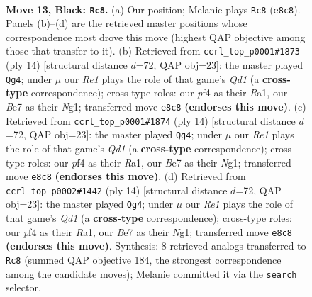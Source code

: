 \documentclass[11pt]{article}
\begin{document}
\clearpage

\begin{figure}[p]\centering
\begin{subfigure}{0.46\textwidth}\centering
\resizebox{\linewidth}{!}{%
\newchessgame
\chessboard[
  setfen={rn2r1k1/ppp1bp1p/3q2p1/3pNb2/P2P1P1P/6P1/1P2P3/RNBQ1RK1 b - - 0 13},
  showmover=false,
  pgfstyle=straightmove, color=movearrow, markmove={e8-c8}
]}
\caption{}
\end{subfigure}\hfill
\begin{subfigure}{0.46\textwidth}\centering
\resizebox{\linewidth}{!}{%
\newchessgame
\chessboard[
  setfen={rnbqk2r/ppp2pp1/4p2p/3pP3/3Pn3/2P5/P1PB1PPP/R2QKBNR w KQkq - 1 8},
  showmover=false,
  pgfstyle=straightmove, color=movearrow, markmove={d1-g4}
]}
\caption{}
\end{subfigure}
\\[4pt]
\begin{subfigure}{0.46\textwidth}\centering
\resizebox{\linewidth}{!}{%
\newchessgame
\chessboard[
  setfen={rnbqk2r/ppp2pp1/4p2p/3pP3/3Pn3/2P5/P1PB1PPP/R2QKBNR w KQkq - 1 8},
  showmover=false,
  pgfstyle=straightmove, color=movearrow, markmove={d1-g4}
]}
\caption{}
\end{subfigure}\hfill
\begin{subfigure}{0.46\textwidth}\centering
\resizebox{\linewidth}{!}{%
\newchessgame
\chessboard[
  setfen={rnbqk2r/ppp2pp1/4p2p/3pP3/3Pn3/2P5/P1PB1PPP/R2QKBNR w KQkq - 1 8},
  showmover=false,
  pgfstyle=straightmove, color=movearrow, markmove={d1-g4}
]}
\caption{}
\end{subfigure}
\caption{\textbf{Move 13, Black: \texttt{Rc8}.} (a) Our position; Melanie plays \texttt{Rc8} (\texttt{e8c8}). Panels (b)--(d) are the retrieved master positions whose correspondence most drove this move (highest QAP objective among those that transfer to it). (b) Retrieved from \texttt{ccrl\_top\_p0001\#1873} (ply 14) [structural distance $d$=72, QAP obj=23]: the master played \texttt{Qg4}; under $\mu$ our \emph{Re1} plays the role of that game's \emph{Qd1} (a \textbf{cross-type} correspondence); cross-type roles: our \emph{p}f4 as their \emph{R}a1, our \emph{B}e7 as their \emph{N}g1; transferred move \texttt{e8c8} \textbf{(endorses this move)}. (c) Retrieved from \texttt{ccrl\_top\_p0001\#1874} (ply 14) [structural distance $d$=72, QAP obj=23]: the master played \texttt{Qg4}; under $\mu$ our \emph{Re1} plays the role of that game's \emph{Qd1} (a \textbf{cross-type} correspondence); cross-type roles: our \emph{p}f4 as their \emph{R}a1, our \emph{B}e7 as their \emph{N}g1; transferred move \texttt{e8c8} \textbf{(endorses this move)}. (d) Retrieved from \texttt{ccrl\_top\_p0002\#1442} (ply 14) [structural distance $d$=72, QAP obj=23]: the master played \texttt{Qg4}; under $\mu$ our \emph{Re1} plays the role of that game's \emph{Qd1} (a \textbf{cross-type} correspondence); cross-type roles: our \emph{p}f4 as their \emph{R}a1, our \emph{B}e7 as their \emph{N}g1; transferred move \texttt{e8c8} \textbf{(endorses this move)}. Synthesis: 8 retrieved analogs transferred to \texttt{Rc8} (summed QAP objective 184, the strongest correspondence among the candidate moves); Melanie committed it via the \texttt{search} selector.}
\label{fig:thought-m25}
\end{figure}
\end{document}
